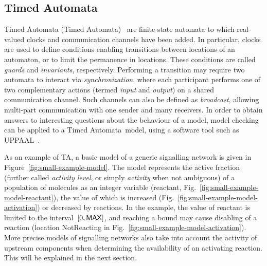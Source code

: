 \documentclass[journal, 10pt]{IEEEtran}
\def\tas{Timed Automata}
\begin{document}
\subsection{Timed Automata}\label{sec:TA}
Timed Automata (\tas)~\cite{timed-automata-alur} are finite-state automata to which real-valued clocks
and communication channels have been added. In particular, clocks are used to define conditions enabling
transitions between locations of an automaton, or to limit the permanence in locations. These conditions are
called \emph{guards} and \emph{invariants}, respectively. Performing a transition may require two automata
to interact via \emph{synchronization}, where each participant performs one of two complementary actions (termed \emph{input} and \emph{output})
on a shared communication channel. Such channels can also be defined as \emph{broadcast}, allowing multi-part
communication with one sender and many receivers.
In order to obtain answers to interesting questions about the behaviour of a model, model checking~\cite{model-checking} can be applied to a \tas\ model,
using a software tool such as UPPAAL~\cite{uppaal}.

As an example of TA, a basic model of a generic signalling network is given in Figure~\ref{fig:small-example-model}.
The model represents the active fraction (further called \emph{activity level}, or simply \emph{activity} when
not ambiguous) of a population of molecules as an integer variable ({\sf reactant}, Fig.~\ref{fig:small-example-model-reactant}),
the value of which is increased (Fig.~\ref{fig:small-example-model-activation}) or decreased
by reactions. In the example, the value of {\sf reactant} is limited to 
the interval~$[0, \mbox{\sf MAX}]$, and reaching a bound may cause disabling of a reaction
(location {\sf NotReacting} in Fig.~\ref{fig:small-example-model-activation}).
More precise models of signalling networks also take into account the activity of upstream components 
when determining the availability of an activating reaction. This will be explained in the next section.

\def\taScalea{0.3}
\def\taScaleb{0.12}
\end{document}
